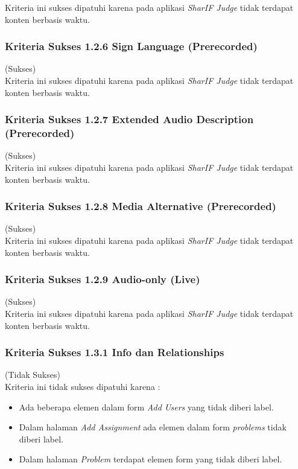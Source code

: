 Kriteria ini sukses dipatuhi karena pada aplikasi \textit{SharIF Judge} tidak terdapat konten berbasis waktu.

\subsubsection{Kriteria Sukses 1.2.6 Sign Language (Prerecorded)}
\label{subsubsec:kepatuhan_kriteria_1.2.6}
(Sukses) \\

Kriteria ini sukses dipatuhi karena pada aplikasi \textit{SharIF Judge} tidak terdapat konten berbasis waktu.

\subsubsection{Kriteria Sukses 1.2.7 Extended Audio Description (Prerecorded)}
\label{subsubsec:kepatuhan_kriteria_1.2.7}
(Sukses) \\

Kriteria ini sukses dipatuhi karena pada aplikasi \textit{SharIF Judge} tidak terdapat konten berbasis waktu.

\subsubsection{Kriteria Sukses 1.2.8 Media Alternative (Prerecorded)}
\label{subsubsec:kepatuhan_kriteria_1.2.8}
(Sukses) \\

Kriteria ini sukses dipatuhi karena pada aplikasi \textit{SharIF Judge} tidak terdapat konten berbasis waktu.

\subsubsection{Kriteria Sukses 1.2.9 Audio-only (Live)}
\label{subsubsec:kepatuhan_kriteria_1.2.9}
(Sukses) \\

Kriteria ini sukses dipatuhi karena pada aplikasi \textit{SharIF Judge} tidak terdapat konten berbasis waktu.

\subsubsection{Kriteria Sukses 1.3.1 Info dan Relationships}
\label{subsubsec:kepatuhan_kriteria_1.3.1}
(Tidak Sukses) \\

Kriteria ini tidak sukses dipatuhi karena :
\begin{itemize}
	\item Ada beberapa elemen dalam form \textit{Add Users} yang tidak diberi label.
	\item Dalam halaman \textit{Add Assignment} ada elemen dalam form \textit{problems} tidak diberi label.
	\item Dalam halaman \textit{Problem} terdapat elemen form yang tidak diberi label.
\end{itemize}

